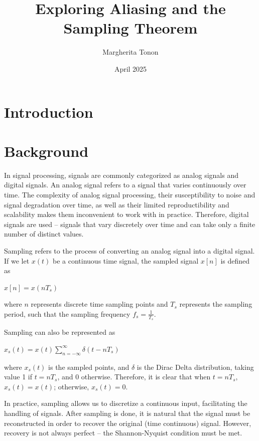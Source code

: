 \documentclass{article}
\title{Exploring Aliasing and the Sampling Theorem} %
\author{Margherita Tonon}
\date{April 2025}
\begin{document}
\maketitle

\section{Introduction}

\section{Background}
In signal processing, signals are commonly categorized as analog signals and digital signals.
An analog signal refers to a signal that varies continuously over time. 
The complexity of analog signal processing, their susceptibility to noise and signal degradation over time, as well as their limited reproductibility and scalability makes them inconvenient to work with in practice. 
Therefore, digital signals are used -- signals that vary discretely over time and can take only a finite number of distinct values.

Sampling refers to the process of converting an analog signal into a digital signal. If we let $x(t)$ be a continuous time signal, the sampled signal $x[n]$ is defined as
\begin{center}
    \begin{math}
        x[n] = x(nT_s)
    \end{math}  
\end{center}
where $n$ represents discrete time sampling points and $T_s$ represents the sampling period, such that the sampling frequency $f_s = \frac{1}{T_s}$.

Sampling can also be represented as 
\begin{center}
    \begin{math}
        x_s(t) = x(t) \displaystyle\sum_{n=-\infty}^{\infty} \delta (t-nT_s)
    \end{math}  
\end{center}
where $x_s(t)$ is the sampled points, and $\delta$ is the Dirac Delta distribution, taking value 1 if $t=nT_s$, and 0 otherwise.
Therefore, it is clear that when $t=nT_s$, $x_s(t) = x(t)$; otherwise, $x_s(t) = 0$. 

In practice, sampling allows us to discretize a continuous input, facilitating the handling of signals. After sampling is done, it is natural that the signal must be reconstructed in order to recover the original (time continuous) signal.
However, recovery is not always perfect -- the Shannon-Nyquist condition must be met.
\end{document}
